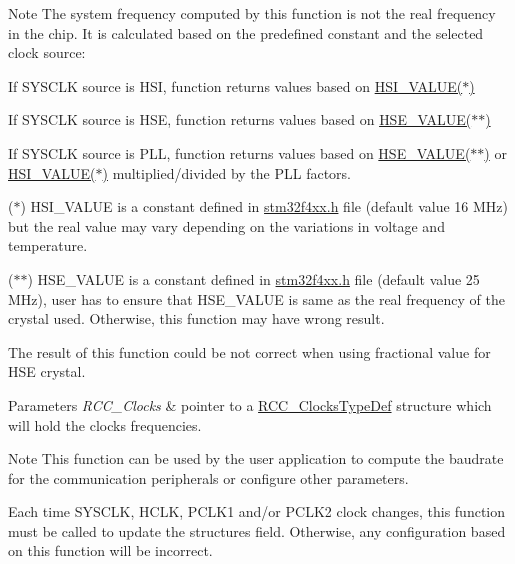 \begin{DoxyNote}{Note}
The system frequency computed by this function is not the real frequency in the chip. It is calculated based on the predefined constant and the selected clock source\+: 

If S\+Y\+S\+C\+LK source is H\+SI, function returns values based on \hyperlink{group___library__configuration__section_gaaa8c76e274d0f6dd2cefb5d0b17fbc37}{H\+S\+I\+\_\+\+V\+A\+L\+U\+E($\ast$)} 

If S\+Y\+S\+C\+LK source is H\+SE, function returns values based on \hyperlink{group___library__configuration__section_gaeafcff4f57440c60e64812dddd13e7cb}{H\+S\+E\+\_\+\+V\+A\+L\+U\+E($\ast$$\ast$)} 

If S\+Y\+S\+C\+LK source is P\+LL, function returns values based on \hyperlink{group___library__configuration__section_gaeafcff4f57440c60e64812dddd13e7cb}{H\+S\+E\+\_\+\+V\+A\+L\+U\+E($\ast$$\ast$)} or \hyperlink{group___library__configuration__section_gaaa8c76e274d0f6dd2cefb5d0b17fbc37}{H\+S\+I\+\_\+\+V\+A\+L\+U\+E($\ast$)} multiplied/divided by the P\+LL factors. 

($\ast$) H\+S\+I\+\_\+\+V\+A\+L\+UE is a constant defined in \hyperlink{stm32f4xx_8h}{stm32f4xx.\+h} file (default value 16 M\+Hz) but the real value may vary depending on the variations in voltage and temperature. 

($\ast$$\ast$) H\+S\+E\+\_\+\+V\+A\+L\+UE is a constant defined in \hyperlink{stm32f4xx_8h}{stm32f4xx.\+h} file (default value 25 M\+Hz), user has to ensure that H\+S\+E\+\_\+\+V\+A\+L\+UE is same as the real frequency of the crystal used. Otherwise, this function may have wrong result.

The result of this function could be not correct when using fractional value for H\+SE crystal.
\end{DoxyNote}

\begin{DoxyParams}{Parameters}
{\em R\+C\+C\+\_\+\+Clocks} & pointer to a \hyperlink{struct_r_c_c___clocks_type_def}{R\+C\+C\+\_\+\+Clocks\+Type\+Def} structure which will hold the clocks frequencies.\\
\hline
\end{DoxyParams}
\begin{DoxyNote}{Note}
This function can be used by the user application to compute the baudrate for the communication peripherals or configure other parameters. 

Each time S\+Y\+S\+C\+LK, H\+C\+LK, P\+C\+L\+K1 and/or P\+C\+L\+K2 clock changes, this function must be called to update the structure\textquotesingle{}s field. Otherwise, any configuration based on this function will be incorrect.
\end{DoxyNote}

